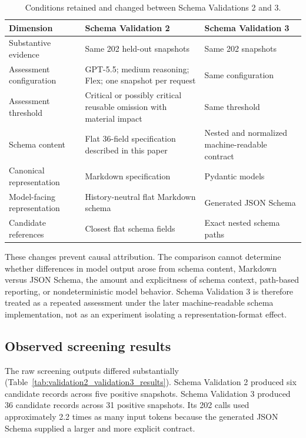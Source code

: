 \documentclass{article}
\begin{document}
\begin{table}[H]
    \centering
    \caption{Conditions retained and changed between Schema Validations 2 and 3.}
    \label{tab:validation2_validation3_design}
    \renewcommand{\arraystretch}{1.15}
    \small
    \begin{tabularx}{\textwidth}{>{\RaggedRight\arraybackslash}p{} >{\RaggedRight\arraybackslash}X >{\RaggedRight\arraybackslash}X}
        \toprule
        \textbf{Dimension} & \textbf{Schema Validation 2} & \textbf{Schema Validation 3} \\
        \midrule
        Substantive evidence & Same 202 held-out snapshots & Same 202 snapshots \\
        Assessment configuration & GPT-5.5; medium reasoning; Flex; one snapshot per request & Same configuration \\
        Assessment threshold & Critical or possibly critical reusable omission with material impact & Same threshold \\
        Schema content & Flat 36-field specification described in this paper & Nested and normalized machine-readable contract \\
        Canonical representation & Markdown specification & Pydantic models \\
        Model-facing representation & History-neutral flat Markdown schema & Generated JSON Schema \\
        Candidate references & Closest flat schema fields & Exact nested schema paths \\
        \bottomrule
    \end{tabularx}
\end{table}

These changes prevent causal attribution. The comparison cannot determine whether differences in model output arose from schema content, Markdown versus JSON Schema, the amount and explicitness of schema context, path-based reporting, or nondeterministic model behavior. Schema Validation 3 is therefore treated as a repeated assessment under the later machine-readable schema implementation, not as an experiment isolating a representation-format effect.

\subsection{Observed screening results}

The raw screening outputs differed substantially (Table~\ref{tab:validation2_validation3_results}). Schema Validation 2 produced six candidate records across five positive snapshots. Schema Validation 3 produced 36 candidate records across 31 positive snapshots. Its 202 calls used approximately 2.2 times as many input tokens because the generated JSON Schema supplied a larger and more explicit contract.
\end{document}
